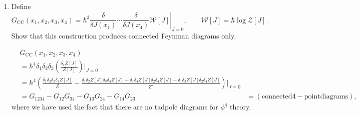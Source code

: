 \begin{enumerate}[label=\alph*)]
\begin{solution}
\begin{center}
        \end{center}
    \end{solution}

    \item Define
    \begin{equation}
        G_{\mathrm{CC}}(x_1,x_2,x_3,x_4)
        =\left.
        \hbar^3
        \frac{\delta}{\delta J(x_1)}\cdots
        \frac{\delta}{\delta J(x_4)}\mathcal W[J]
        \right|_{J=0},
        \qquad
        \mathcal W[J]=\hbar\log\mathcal Z[J].
    \end{equation}
    Show that this construction produces connected Feynman diagrams only.
    \begin{solution}
        \begin{equation}
            \begin{aligned}
                &G_\mathrm{CC}(x_1,x_2,x_3,x_4)\\ &= \hbar^4\delta_1\delta_2\delta_3\left(\frac{\delta_4 Z[J]}{Z[J]}\right)\bigg|_{J=0}\\
            &=\hbar^4\left(\frac{\delta_1\delta_2\delta_3\delta_4 Z[J]}{Z} - \frac{\delta_1\delta_2 Z[J]\delta_3\delta_4 Z[J] + \delta_1\delta_4 Z[J]\delta_2\delta_4 Z[J] + \delta_1\delta_3 Z[J]\delta_2\delta_4 Z[J]}{Z^2}\right)\bigg|_{J=0}\\
            &=G_{1234} - G_{12}G_{34}-G_{13}G_{24}-G_{14}G_{23}
            &= (\mathrm{connected 4-point diagrams}),
            \end{aligned}
        \end{equation}
        where we have used the fact that there are no tadpole diagrams for $\phi^4$ theory.
    \end{solution}
\end{enumerate}

